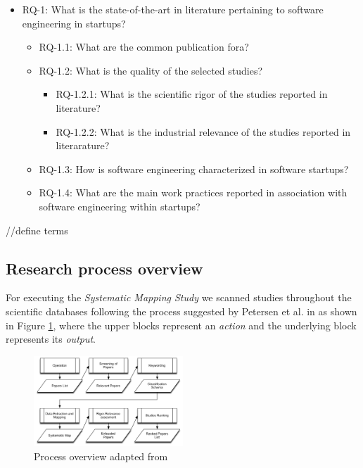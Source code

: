 \documentclass[final,5p,times,twocolumn]{elsarticle}
\begin{document}
\begin{itemize}
\item RQ-1: What is the state-of-the-art in literature pertaining to software engineering in startups?
	\begin{itemize}
	\item RQ-1.1: What are the common publication fora?
	\item RQ-1.2: What is the quality of the selected studies?
		\begin{itemize}
		\item RQ-1.2.1: What is the scientific rigor of the studies reported in literature?
		\item RQ-1.2.2: What is the industrial relevance of the studies reported in literarature?
		\end{itemize}
	\item RQ-1.3: How is software engineering characterized in software startups?
	\item RQ-1.4: What are the main work practices reported in association with software engineering within startups?
	\end{itemize}
\end{itemize}

//define terms


\subsection{Research process overview} %
\label{sub:research_process_overview}
For executing the \textit{Systematic Mapping Study} we scanned studies throughout the scientific databases following the process suggested by Petersen et al. in \cite{Petersen2007} as shown in Figure \ref{fig:ms:sms}, where the upper blocks represent an \textit{action} and the underlying block represents its \textit{output}.

\begin{figure}[H]
\centering
\includegraphics[width=0.5\textwidth,keepaspectratio=true]{figures/process_overview.png}
\caption{Process overview adapted from  \cite{Petersen2007}}
\label{fig:ms:sms}
\end{figure}
\end{document}
